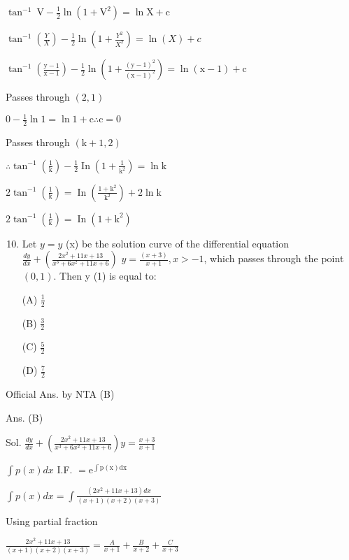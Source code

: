 \documentclass[10pt]{article}
\begin{document}
$\tan ^{-1} \mathrm{~V}-\frac{1}{2} \ln \left(1+\mathrm{V}^{2}\right)=\ln \mathrm{X}+\mathrm{c}$

$\tan ^{-1}\left(\frac{Y}{X}\right)-\frac{1}{2} \ln \left(1+\frac{Y^{2}}{X^{2}}\right)=\ln (X)+c$

$\tan ^{-1}\left(\frac{\mathrm{y}-1}{\mathrm{x}-1}\right)-\frac{1}{2} \ln \left(1+\frac{(\mathrm{y}-1)^{2}}{(\mathrm{x}-1)^{2}}\right)=\ln (\mathrm{x}-1)+\mathrm{c}$

Passes through $(2,1)$

$0-\frac{1}{2} \ln 1=\ln 1+\mathrm{c} \therefore \mathrm{c}=0$

Passes through $(\mathrm{k}+1,2)$

$\therefore \tan ^{-1}\left(\frac{1}{\mathrm{k}}\right)-\frac{1}{2} \operatorname{In}\left(1+\frac{1}{\mathrm{k}^{2}}\right)=\ln \mathrm{k}$

$2 \tan ^{-1}\left(\frac{1}{\mathrm{k}}\right)=\operatorname{In}\left(\frac{1+\mathrm{k}^{2}}{\mathrm{k}^{2}}\right)+2 \ln \mathrm{k}$

$2 \tan ^{-1}\left(\frac{1}{\mathrm{k}}\right)=\operatorname{In}\left(1+\mathrm{k}^{2}\right)$

\begin{enumerate}
  \setcounter{enumi}{9}
  \item Let $y=y$ (x) be the solution curve of the differential equation $\frac{d y}{d x}+\left(\frac{2 x^{2}+11 x+13}{x^{3}+6 x^{2}+11 x+6}\right)$ $y=\frac{(x+3)}{x+1}, x>-1$, which passes through the point $(0,1)$. Then y (1) is equal to:

(A) $\frac{1}{2}$

(B) $\frac{3}{2}$

(C) $\frac{5}{2}$

(D) $\frac{7}{2}$
\end{enumerate}

Official Ans. by NTA (B)

Ans. (B)

Sol. $\frac{d y}{d x}+\left(\frac{2 x^{2}+11 x+13}{x^{3}+6 x^{2}+11 x+6}\right) y=\frac{x+3}{x+1}$

$\int p(x) d x$ I.F. $=\mathrm{e}^{\int \mathrm{p}(\mathrm{x}) \mathrm{dx}}$

$\int p(x) d x=\int \frac{\left(2 x^{2}+11 x+13\right) d x}{(x+1)(x+2)(x+3)}$

Using partial fraction

$\frac{2 x^{2}+11 x+13}{(x+1)(x+2)(x+3)}=\frac{A}{x+1}+\frac{B}{x+2}+\frac{C}{x+3}$
\end{document}
